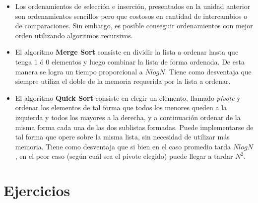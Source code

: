 \begin{itemize}

\item Los ordenamientos de selección e inserción, presentados en la unidad
anterior son ordenamientos sencillos pero que costosos en cantidad de
intercambios o de comparaciones.  Sin embargo, es posible conseguir
ordenamientos con mejor orden utilizando algoritmos recursivos.

\item El algoritmo {\bf Merge Sort} consiste en dividir la lista a ordenar
hasta que tenga 1 ó 0 elementos y luego combinar la lista de forma ordenada.
De esta manera se logra un tiempo proporcional a $N log N$.  Tiene como
desventaja que siempre utiliza el doble de la memoria requerida por la lista a
ordenar.

\item El algoritmo {\bf Quick Sort} consiste en elegir un elemento, llamado
{\it pivote} y ordenar los elementos de tal forma que todos los menores queden
a la izquierda y todos los mayores a la derecha, y a continuación ordenar de la
misma forma cada una de las dos sublistas formadas.  Puede implementarse de tal
forma que opere sobre la misma lista, sin necesidad de utilizar más memoria.
Tiene como desventaja que si bien en el caso promedio tarda $N log N$, en el
peor caso (según cuál sea el pivote elegido) puede llegar a tardar $N^2$.

\end{itemize}

\newpage
\section{Ejercicios}



